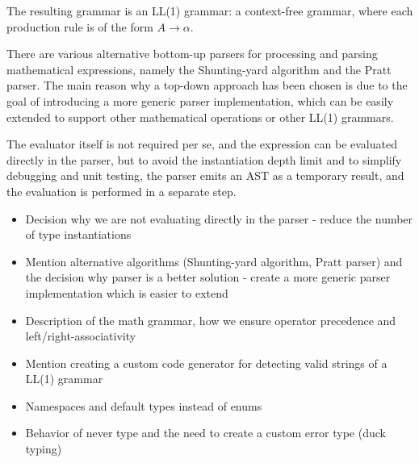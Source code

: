 The resulting grammar is an LL(1) grammar: a context-free grammar, where each production rule is of the form $A \rightarrow \alpha$. 


There are various alternative bottom-up parsers for processing and parsing mathematical expressions, namely the Shunting-yard algorithm and the Pratt parser. The main reason why a top-down approach has been chosen is due to the goal of introducing a more generic parser implementation, which can be easily extended to support other mathematical operations or other LL(1) grammars. 


The evaluator itself is not required per se, and the expression can be evaluated directly in the parser, but to avoid the instantiation depth limit and to simplify debugging and unit testing, the parser emits an AST as a temporary result, and the evaluation is performed in a separate step. 

\begin{itemize}
  \item Decision why we are not evaluating directly in the parser - reduce the number of type instantiations
  \item Mention alternative algorithms (Shunting-yard algorithm, Pratt parser) and the decision why parser is a better solution - create a more generic parser implementation which is easier to extend
  \item Description of the math grammar, how we ensure operator precedence and left/right-associativity
  \item Mention creating a custom code generator for detecting valid strings of a LL(1) grammar
  \item Namespaces and default types instead of enums
  \item Behavior of never type and the need to create a custom error type (duck typing)
\end{itemize}
